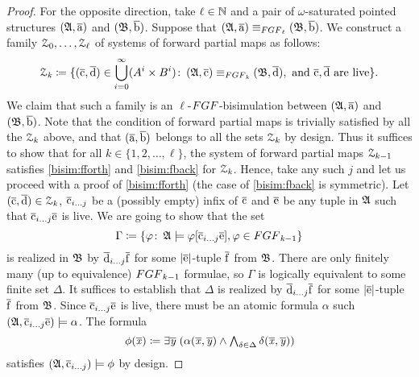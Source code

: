 \begin{proof}
For the opposite direction, take $\ell \in {\mathbb{N}}$ and a pair of $\omega$-saturated pointed structures $({\mathfrak{A}}, \overline{\mathrm{a}})$ and $({\mathfrak{B}}, \overline{\mathrm{b}})$.
Suppose that $(\str{A}, \elemtuplea) \equiv_{\FGF_\ell} (\str{B}, \elemtupleb)$.
We construct a family $\mathcal{Z}_0, \ldots, \mathcal{Z}_\ell$ of systems of forward partial maps as follows:
\[
	\bisimZ_{\mathit{k}} \coloneqq \{ (\elemtuplec, \elemtupled) \in \bigcup_{i=0}^{\infty} (A^i \times B^i) \colon\,  (\str{A}, \elemtuplec) \equiv_{\FGF_{\mathit{k}}} (\str{B}, \elemtupled), \ \text{and} \ \elemtuplec, \elemtupled \ \text{are live} \}.
\]
We claim that such a family is an $\ell$-$\FGF$-bisimulation between $({\mathfrak{A}}, \overline{\mathrm{a}})$ and $({\mathfrak{B}}, \overline{\mathrm{b}})$.
	Note that the condition of forward partial maps is trivially satisfied by all the $\mathcal{Z}_{\mathit{k}}$ above, and that $(\overline{\mathrm{a}}, \overline{\mathrm{b}})$ belongs to all the sets $\mathcal{Z}_{\mathit{k}}$ by design.
Thus it suffices to show that for all $\mathit{k} \in \{ 1, 2, \ldots, \ell\}$, the system of forward partial
maps $\mathcal{Z}_{k-1}$ satisfies \ref{bisim:fforth} and \ref{bisim:fback} for $\mathcal{Z}_{\mathit{k}}$.
Hence, take any such $j$ and let us proceed with a proof of \ref{bisim:fforth} (the case of \ref{bisim:fback} is symmetric).
	Let $(\overline{\mathrm{c}}, \overline{\mathrm{d}}) \in \mathcal{Z}_{\mathit{k}}$, $\overline{\mathrm{c}}_{i\ldots j}$ be a (possibly empty) infix of $\overline{\mathrm{c}}$
and $\overline{\mathrm{e}}$ be any tuple in ${\mathfrak{A}}$ such that $\overline{\mathrm{c}}_{i\ldots j}\overline{\mathrm{e}}$ is live.
We are going to show that the set
\[
  \Gamma \deff \{ \varphi \colon\, \str{A} \models \varphi[\elemtuplecfromto{i}{j}\elemtuplee], \varphi \in \FGF_{\mathit{k}{-}1} \}
\]
is realized in ${\mathfrak{B}}$ by $\overline{\mathrm{d}}_{i\ldots j}\overline{\mathrm{f}}$ for some $|\overline{\mathrm{e}}|$-tuple $\overline{\mathrm{f}}$ from ${\mathfrak{B}}$.
There are only finitely many (up to equivalence) $\FGF_{k{-}1}$ formulae, so $\Gamma$ is logically equivalent to some finite set $\Delta$.
It suffices to establish that $\Delta$ is realized by $\overline{\mathrm{d}}_{i\ldots j}\overline{\mathrm{f}}$ for some $|\overline{\mathrm{e}}|$-tuple $\overline{\mathrm{f}}$ from ${\mathfrak{B}}$.
Since $\overline{\mathrm{c}}_{i\ldots j}\overline{\mathrm{e}}$ is live, there must be an atomic formula $\alpha$ such $({\mathfrak{A}}, \overline{\mathrm{c}}_{i\ldots j}\overline{\mathrm{e}}) \models \alpha$.
The formula
\begin{equation*}
  \phi(\overline{\mathit{x}}) \coloneqq \exists{\overline{\mathit{y}}} \; (\alpha(\overline{\mathit{x}}, \overline{\mathit{y}}) \wedge \textstyle\bigwedge_{\delta \in \Delta} \delta(\overline{\mathit{x}}, \overline{\mathit{y}}))
\end{equation*}
satisfies $({\mathfrak{A}}, \overline{\mathrm{c}}_{i\ldots j}) \models \phi$ by design.

\end{proof}
